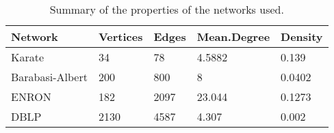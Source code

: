\begin{table}[ht]
\centering
\begin{tabular}{lllll}
  \hline
Network & Vertices & Edges & Mean.Degree & Density \\ 
  \hline
Karate & 34 & 78 & 4.5882 & 0.139 \\ 
  Barabasi-Albert & 200 & 800 & 8 & 0.0402 \\ 
  ENRON & 182 & 2097 & 23.044 & 0.1273 \\ 
  DBLP & 2130 & 4587 & 4.307 & 0.002 \\ 
   \hline
\end{tabular}
\caption{Summary of the properties of the networks used.}
\label{tab:summary}
\end{table}
